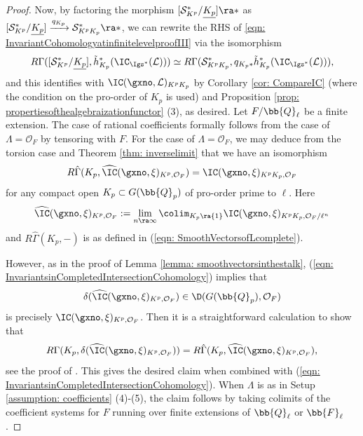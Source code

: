 \documentclass[letterpaper,11pt]{amsart}
\begin{document}
\begin{proof}
Now, by factoring the morphism $[\mathcal{S}^{*}_{K^{p}}/\underline{K_{p}}] \ra \ast$ as $[\mathcal{S}^{*}_{K^{p}}/\underline{K_{p}}] \xrightarrow{q_{K_{p}}} \mathcal{S}^{*}_{K^{p}K_{p}} \ra \ast$, we can rewrite the RHS of \eqref{eqn: InvariantCohomologyatinfinitelevelproofIII} via the isomorphism
\[ R\Gamma([\mathcal{S}_{K^{p}}^{*}/\underline{K_{p}}],\tilde{h}_{K_{p}}^{*}(\IC_{\Igs^{*}}(\mathcal{L}))) \simeq R\Gamma(\mathcal{S}_{K^{p}K_{p}}^{*},q_{K_{p}*}\tilde{h}_{K_{p}}^{*}(\IC_{\Igs^{*}}(\mathcal{L}))), \]
and this identifies with $\IC(\gxno,\mathcal{L})_{K^{p}K_{p}}$ by Corollary \ref{cor: CompareIC} (where the condition on the pro-order of $K_p$ is used) and Proposition \ref{prop: propertiesofthealgebraizationfunctor} (3), as desired. Let $F/\bb{Q}_{\ell}$ be a finite extension. The case of rational coefficients formally follows from the case of $\Lambda = \mathcal{O}_{F}$ by tensoring with $F$. For the case of $\Lambda = \mathcal{O}_{F}$, we may deduce from the torsion case and Theorem \ref{thm: inverselimit} that we have an isomorphism
\begin{equation}{\label{eqn: InvariantsinCompletedIntersectionCohomology}}
R\hat{\Gamma}(K_{p},\widehat{\IC}(\gxno,\xi)_{K^{p},\mathcal{O}_{F}}) = \IC(\gxno,\xi)_{K^{p}K_{p},\mathcal{O}_{F}} 
\end{equation}
for any compact open $K_{p} \subset G(\bb{Q}_{p})$ of pro-order prime to $\ell$. Here 
\[ \widehat{\IC}(\gxno,\xi)_{K^{p},\mathcal{O}_{F}} := \lim_{n \ra \infty} \colim_{K_{p} \ra \{1\}} \IC(\gxno,\xi)_{K^{p}K_{p},\mathcal{O}_{F}/\ell^{n}}  \] 
and $R\hat{\Gamma}(K_{p},-)$ is as defined in (\ref{eqn: SmoothVectorsofLcomplete}).

However, as in the proof of Lemma \ref{lemma: smoothvectorsinthestalk}, (\ref{eqn: InvariantsinCompletedIntersectionCohomology}) implies that 
\[ \delta(\widehat{\IC}(\gxno,\xi)_{K^{p},\mathcal{O}_{F}}) \in \D(G(\bb{Q}_{p}),\mathcal{O}_{F}) \]
is precisely $\IC(\gxno,\xi)_{K^{p},\mathcal{O}_{F}}$. Then it is a straightforward calculation to show that 
\[ R\Gamma(K_{p},\delta(\widehat{\IC}(\gxno,\xi)_{K^{p},\mathcal{O}_{F}})) = R\hat{\Gamma}(K_{p},\widehat{\IC}(\gxno,\xi)_{K^{p},\mathcal{O}_{F}}), \]
see the proof of \cite[Proposition~2.6]{HansenSupercuspidalCohomology}. This gives the desired claim when combined with (\ref{eqn: InvariantsinCompletedIntersectionCohomology}). When $\Lambda$ is as in Setup \ref{assumption: coefficients} (4)-(5), the claim follows by taking colimits of the coefficient systems for $F$ running over finite extensions of $\bb{Q}_\ell$ or $\bb{F}_{\ell}$.
\end{proof}
\end{document}
